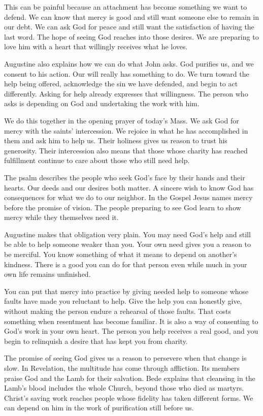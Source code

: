 This can be painful because an attachment has become something we want to defend. We can know that mercy is good and still want someone else to remain in our debt. We can ask God for peace and still want the satisfaction of having the last word. The hope of seeing God reaches into those desires. We are preparing to love him with a heart that willingly receives what he loves.

Augustine also explains how we can do what John asks. God purifies us, and we consent to his action. Our will really has something to do. We turn toward the help being offered, acknowledge the sin we have defended, and begin to act differently. Asking for help already expresses that willingness. The person who asks is depending on God and undertaking the work with him.

We do this together in the opening prayer of today's Mass. We ask God for mercy with the saints' intercession. We rejoice in what he has accomplished in them and ask him to help us. Their holiness gives us reason to trust his generosity. Their intercession also means that those whose charity has reached fulfillment continue to care about those who still need help.

The psalm describes the people who seek God's face by their hands and their hearts. Our deeds and our desires both matter. A sincere wish to know God has consequences for what we do to our neighbor. In the Gospel Jesus names mercy before the promise of vision. The people preparing to see God learn to show mercy while they themselves need it.

Augustine makes that obligation very plain. You may need God's help and still be able to help someone weaker than you. Your own need gives you a reason to be merciful. You know something of what it means to depend on another's kindness. There is a good you can do for that person even while much in your own life remains unfinished.

You can put that mercy into practice by giving needed help to someone whose faults have made you reluctant to help. Give the help you can honestly give, without making the person endure a rehearsal of those faults. That costs something when resentment has become familiar. It is also a way of consenting to God's work in your own heart. The person you help receives a real good, and you begin to relinquish a desire that has kept you from charity.

The promise of seeing God gives us a reason to persevere when that change is slow. In Revelation, the multitude has come through affliction. Its members praise God and the Lamb for their salvation. Bede explains that cleansing in the Lamb's blood includes the whole Church, beyond those who died as martyrs. Christ's saving work reaches people whose fidelity has taken different forms. We can depend on him in the work of purification still before us.

